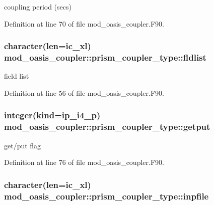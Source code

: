 coupling period (secs) 



Definition at line 70 of file mod\+\_\+oasis\+\_\+coupler.\+F90.

\hypertarget{structmod__oasis__coupler_1_1prism__coupler__type_a559f90a9b77db151a2a39802a66ddf2b}{
\subsubsection[{fldlist}]{\setlength{\rightskip}{0pt plus 5cm}character(len=ic\+\_\+xl) mod\+\_\+oasis\+\_\+coupler\+::prism\+\_\+coupler\+\_\+type\+::fldlist\hspace{0.3cm}{\ttfamily [private]}}}\label{structmod__oasis__coupler_1_1prism__coupler__type_a559f90a9b77db151a2a39802a66ddf2b}


field list 



Definition at line 56 of file mod\+\_\+oasis\+\_\+coupler.\+F90.

\hypertarget{structmod__oasis__coupler_1_1prism__coupler__type_a72f8ada57213a9c0e6ab85742c521f86}{
\subsubsection[{getput}]{\setlength{\rightskip}{0pt plus 5cm}integer(kind=ip\+\_\+i4\+\_\+p) mod\+\_\+oasis\+\_\+coupler\+::prism\+\_\+coupler\+\_\+type\+::getput\hspace{0.3cm}{\ttfamily [private]}}}\label{structmod__oasis__coupler_1_1prism__coupler__type_a72f8ada57213a9c0e6ab85742c521f86}


get/put flag 



Definition at line 76 of file mod\+\_\+oasis\+\_\+coupler.\+F90.

\hypertarget{structmod__oasis__coupler_1_1prism__coupler__type_a0ecb3c23d7b761aa9bfad0fbb59e40d3}{
\subsubsection[{inpfile}]{\setlength{\rightskip}{0pt plus 5cm}character(len=ic\+\_\+xl) mod\+\_\+oasis\+\_\+coupler\+::prism\+\_\+coupler\+\_\+type\+::inpfile\hspace{0.3cm}{\ttfamily [private]}}}\label{structmod__oasis__coupler_1_1prism__coupler__type_a0ecb3c23d7b761aa9bfad0fbb59e40d3}


